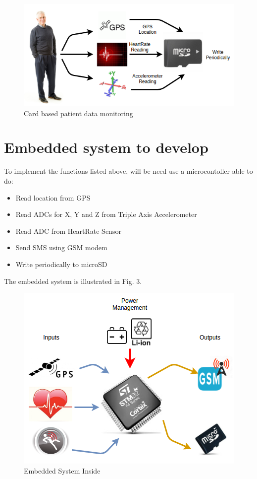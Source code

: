 \documentclass[10pt,journal,compsoc]{IEEEtran}
\begin{document}
\begin{figure}[h]
  \centering
  \captionsetup{justification=centering}
  \includegraphics[scale=.40]{es1}
  \caption{Card based patient data monitoring}
  \label{fig:fig2}
\end{figure}

\hfil

\section{Embedded system to develop}

To implement the functions listed above, will be need use a microcontoller able to do:

\begin{itemize}
  \item Read location from GPS
  \item Read ADCs for X, Y and Z from Triple Axis Accelerometer
  \item Read ADC from HeartRate Sensor
  \item Send SMS using GSM modem
  \item Write periodically to microSD
\end{itemize}

\hfil

The embedded system is illustrated in Fig. 3.

\begin{figure}[h]
  \centering
  \captionsetup{justification=centering}
  \includegraphics[scale=.50]{es2}
  \caption{Embedded System Inside}
  \label{fig:fig3}
\end{figure}
\end{document}
